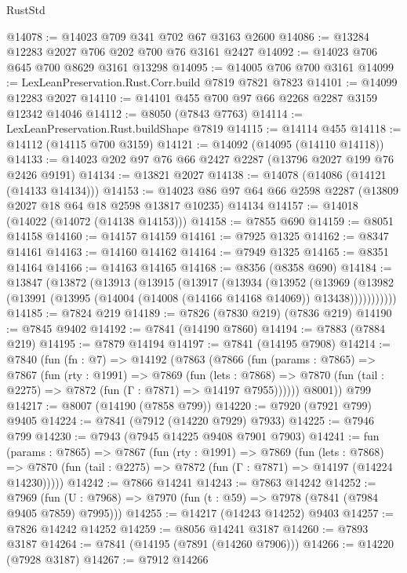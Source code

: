 \begin{lexlean}{RustStd}
\begin{coremodule}
{\begin{coremodule}
{{{{{{{{{{{{{{{{{{{{{{{{{{{{{{{{{{{{{{{{{{{{{{{{{{{{{{@14078 := @14023 @709 @341 @702 @67 @3163 @2600
@14086 := @13284 @12283 @2027 @706 @202 @700 @76 @3161 @2427
@14092 := @14023 @706 @645 @700 @8629 @3161 @13298
@14095 := @14005 @706 @700 @3161
@14099 := LexLeanPreservation.Rust.Corr.build @7819 @7821 @7823
@14101 := @14099 @12283 @2027
@14110 := @14101 @455 @700 @97 @66 @2268 @2287 @3159 @12342 @14046
@14112 := @8050 (@7843 @7763)
@14114 := LexLeanPreservation.Rust.buildShape @7819
@14115 := @14114 @455
@14118 := @14112 (@14115 @700 @3159)
@14121 := @14092 (@14095 (@14110 @14118))
@14133 := @14023 @202 @97 @76 @66 @2427 @2287 (@13796 @2027 @199 @76 @2426 @9191)
@14134 := @13821 @2027
@14138 := @14078 (@14086 (@14121 (@14133 @14134)))
@14153 := @14023 @86 @97 @64 @66 @2598 @2287 (@13809 @2027 @18 @64 @18 @2598 @13817 @10235) @14134
@14157 := @14018 (@14022 (@14072 (@14138 @14153)))
@14158 := @7855 @690
@14159 := @8051 @14158
@14160 := @14157 @14159
@14161 := @7925 @1325
@14162 := @8347 @14161
@14163 := @14160 @14162
@14164 := @7949 @1325
@14165 := @8351 @14164
@14166 := @14163 @14165
@14168 := @8356 (@8358 @690)
@14184 := @13847
    (@13872
      (@13913
        (@13915
          (@13917
            (@13934
              (@13952
                (@13969
                  (@13982 (@13991 (@13995 (@14004 (@14008 (@14166 @14168 @14069)) @13438)))))))))))
@14185 := @7824 @219
@14189 := @7826 (@7830 @219) (@7836 @219)
@14190 := @7845 @9402
@14192 := @7841 (@14190 @7860)
@14194 := @7883 (@7884 @219)
@14195 := @7879 @14194
@14197 := @7841 (@14195 @7908)
@14214 := @7840
    (fun (fn : @7) =>
    @14192
      (@7863
        (@7866
          (fun (params : @7865) =>
          @7867
            (fun (rty : @1991) =>
            @7869
              (fun (lets : @7868) =>
              @7870 (fun (tail : @2275) => @7872 (fun (Γ : @7871) => @14197 @7955))))))
        @8001))
    @799
@14217 := @8007 (@14190 (@7858 @799))
@14220 := @7920 (@7921 @799) @9405
@14224 := @7841 (@7912 (@14220 @7929) @7933)
@14225 := @7946 @799
@14230 := @7943 (@7945 @14225 @9408 @7901 @7903)
@14241 := fun (params : @7865) =>
  @7867
    (fun (rty : @1991) =>
    @7869
      (fun (lets : @7868) =>
      @7870 (fun (tail : @2275) => @7872 (fun (Γ : @7871) => @14197 (@14224 @14230)))))
@14242 := @7866 @14241
@14243 := @7863 @14242
@14252 := @7969
    (fun (U : @7968) => @7970 (fun (t : @59) => @7978 (@7841 (@7984 @9405 @7859) @7995)))
@14255 := @14217 (@14243 @14252) @9403
@14257 := @7826 @14242 @14252
@14259 := @8056 @14241 @3187
@14260 := @7893 @3187
@14264 := @7841 (@14195 (@7891 (@14260 @7906)))
@14266 := @14220 (@7928 @3187)
@14267 := @7912 @14266
}}}}}}}}}}}}}}}}}}}}}}}}}}}}}}}}}}}}}}}}}}}}}}}}}}}}}}
\end{coremodule}}
\end{coremodule}
\end{lexlean}

